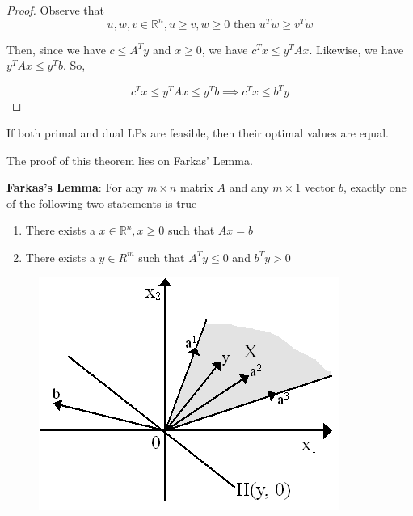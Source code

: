 \documentclass[../notes.tex]{subfiles}
\begin{document}
\begin{proof}
    Observe that
\begin{equation}
    u, w, v \in \mathbb{R}^n, u \ge  v, w \ge 0 \text{ then  } u^Tw \ge v^Tw
\end{equation}

Then, since we have $ c \le  A^T y $ and $ x \ge 0 $, we have $ c^Tx \le  y^T Ax $. Likewise, we have $ y^TAx \le  y^T b $. So,

\begin{equation}
    c^Tx \le  y^T Ax \le  y^T b \implies c^Tx \le  b^Ty
\end{equation}
    
\end{proof}



\begin{theorem}
    If both primal and dual LPs are feasible, then their optimal values are equal.
\end{theorem}

The proof of this theorem lies on Farkas' Lemma.

\begin{lemma}
    \textbf{Farkas's Lemma}: For any $ m \times  n $ matrix $ A $ and any $ m \times 1 $ vector $ b $, exactly one of the following two statements is true

    \begin{enumerate}
        \item There exists a $ x \in \mathbb{R}^n, x \ge  0  $ such that $ Ax = b $
        \item There exists a $ y \in R^m $ such that $ A^Ty \le  0 $ and $ b^Ty > 0 $ 
    \end{enumerate}

\end{lemma}



\begin{figure}[H]
    \centering
    \includegraphics[width=0.8\linewidth]{img/image_2023-03-29-12-40-27.png}
\end{figure}
\end{document}
